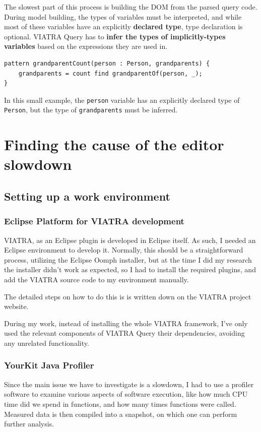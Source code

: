 \documentclass[11pt,a4paper,oneside]{report}
\begin{document}
The slowest part of this process is building the DOM from the parsed query code.
During model building, the types of variables must be interpreted, and while
most of these variables have an explicitly \textbf{declared type}, type
declaration is optional. VIATRA Query has to \textbf{infer the types of
implicitly-types variables} based on the expressions they are used in.

\pagebreak
\begin{lstlisting}[caption={A pattern with variables of both declared and inferred types}, frame=single]
pattern grandparentCount(person : Person, grandparents) {
    grandparents = count find grandparentOf(person, _);
}
\end{lstlisting}

In this small example, the \texttt{person} variable has an explicitly declared
type of \texttt{Person}, but the type of \texttt{grandparents} must be inferred.

\chapter{Finding the cause of the editor slowdown}

\section{Setting up a work environment}

\subsection{Eclipse Platform for VIATRA development}
VIATRA, as an Eclipse plugin is developed in Eclipse itself. As such, I needed
an Eclipse environment to develop it. Normally, this should be a straightforward
process, utilizing the Eclipse Oomph installer, but at the time I did my
research the installer didn't work as expected, so I had to install the required
plugins, and add the VIATRA source code to my environment manually.

The detailed steps on how to do this is is written down on the VIATRA project
website\cite{ujhelyi_harmath_david_nagy_hegedus_2019}.

During my work, instead of installing the whole VIATRA framework, I've only
used the relevant components of VIATRA Query their dependencies, avoiding any
unrelated functionality.

\subsection{YourKit Java Profiler}
Since the main issue we have to investigate is a slowdown, I had to use a
profiler software to examine various aspects of software execution, like how
much CPU time did we spend in functions, and how many times functions were
called. Measured data is then compiled into a snapshot, on which one can perform
further analysis.
\end{document}
